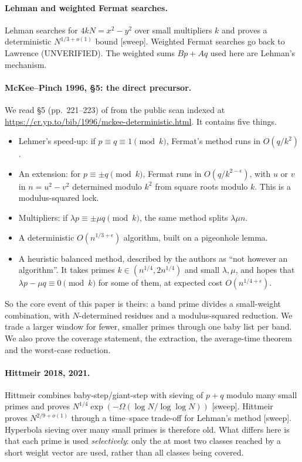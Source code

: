 \documentclass[11pt]{amsart}
\theoremstyle{definition}
\begin{document}
\paragraph{Lehman and weighted Fermat searches.}
Lehman \cite{lehman1974} searches for $4kN=x^2-y^2$ over small multipliers $k$ and proves a
deterministic $N^{1/3+o(1)}$ bound [sweep]. Weighted Fermat searches go back to Lawrence
\cite{lawrence1895} (UNVERIFIED). The weighted sums $Bp+Aq$ used here are Lehman's mechanism.

\paragraph{McKee--Pinch 1996, \S5: the direct precursor.}
We read \S5 (pp.~221--223) of \cite{mckeepinch1996} from the public scan indexed at
\url{https://cr.yp.to/bib/1996/mckee-deterministic.html}. It contains five things.
\begin{itemize}
\item Lehmer's speed-up: if $p\equiv q\equiv1\pmod k$, Fermat's method runs in $O(q/k^2)$.
\item An extension: for $p\equiv\pm q\pmod k$, Fermat runs in $O(q/k^{2-\epsilon})$, with $u$
  or $v$ in $n=u^2-v^2$ determined modulo $k^2$ from square roots modulo $k$. This is a
  modulus-squared lock.
\item Multipliers: if $\lambda p\equiv\pm\mu q\pmod k$, the same method splits $\lambda\mu n$.
\item A deterministic $O(n^{1/3+\epsilon})$ algorithm, built on a pigeonhole lemma.
\item A heuristic balanced method, described by the authors as ``not however an algorithm''.
  It takes primes $k\in(n^{1/4},2n^{1/4})$ and small $\lambda,\mu$, and hopes that
  $\lambda p-\mu q\equiv0\pmod k$ for some of them, at expected cost $O(n^{1/4+\epsilon})$.
\end{itemize}
So the core event of this paper is theirs: a band prime divides a small-weight combination,
with $N$-determined residues and a modulus-squared reduction. We trade a larger window for
fewer, smaller primes through one baby list per band. We also prove the coverage statement, the
extraction, the average-time theorem and the worst-case reduction.

\paragraph{Hittmeir 2018, 2021.}
Hittmeir \cite{hittmeir2018} combines baby-step/giant-step with sieving of $p+q$ modulo many
small primes and proves $N^{1/4}\exp(-\Omega(\log N/\log\log N))$ [sweep].
Hittmeir~\cite{hittmeir2021} proves $N^{2/9+o(1)}$ through a time--space trade-off for Lehman's
method [sweep]. Hyperbola sieving over many small primes is therefore old. What differs here is
that each prime is used \emph{selectively}: only the at most two classes reached by a short weight
vector are used, rather than all classes being covered.
\end{document}
